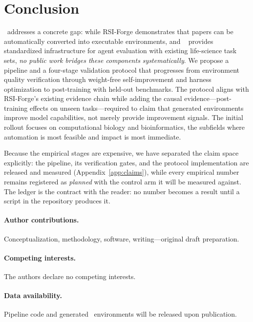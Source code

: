 \section{Conclusion}
\label{sec:conclusion}

\sys\ addresses a concrete gap: while RSI-Forge \cite{rsi-forge} demonstrates
that papers can be automatically converted into executable environments, and
\harbor\ \cite{harbor} provides standardized infrastructure for agent evaluation
with existing life-science task sets, \emph{no public work bridges these
components systematically}. We propose a pipeline and a four-stage validation
protocol that progresses from environment quality verification through
weight-free self-improvement and harness optimization to post-training with
held-out benchmarks. The protocol aligns with RSI-Forge's existing evidence
chain while adding the causal evidence---post-training effects on unseen
tasks---required to claim that generated environments improve model
capabilities, not merely provide improvement signals. The initial rollout
focuses on computational biology and bioinformatics, the subfields where
automation is most feasible and impact is most immediate.

Because the empirical stages are expensive, we have separated the claim space
explicitly: the pipeline, its verification gates, and the protocol
implementation are released and measured (Appendix~\ref{app:claims}), while
every empirical number remains registered as \emph{planned} with the control arm
it will be measured against. The ledger is the contract with the reader: no
number becomes a result until a script in the repository produces it.

\paragraph{Author contributions.} Conceptualization, methodology, software,
writing---original draft preparation.

\paragraph{Competing interests.} The authors declare no competing interests.

\paragraph{Data availability.} Pipeline code and generated \harbor\
environments will be released upon publication.
